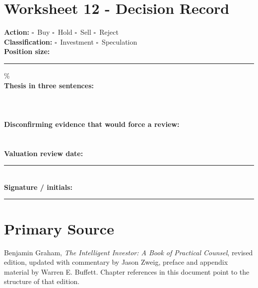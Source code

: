 \documentclass[11pt]{article}
\newcommand{\checkbox}{\(\square\)}
\newcommand{\blankline}{\makebox[\linewidth][l]{\rule{0.96\linewidth}{0.35pt}}}
\begin{document}
\section{Worksheet 12 - Decision Record}
\begin{worksheetbox}
\textbf{Action:} \checkbox\ Buy \quad \checkbox\ Hold \quad \checkbox\ Sell \quad \checkbox\ Reject\\[8pt]
\textbf{Classification:} \checkbox\ Investment \quad \checkbox\ Speculation\\[8pt]
\textbf{Position size:} \rule{1.3in}{0.35pt}\%\\[8pt]
\textbf{Thesis in three sentences:}\\[4pt]\blankline\\[10pt]\blankline\\[10pt]\blankline\\[10pt]
\textbf{Disconfirming evidence that would force a review:}\\[4pt]\blankline\\[10pt]\blankline\\[10pt]
\textbf{Valuation review date:} \rule{1.8in}{0.35pt}\\[8pt]
\textbf{Signature / initials:} \rule{1.8in}{0.35pt}
\end{worksheetbox}

\section*{Primary Source}
Benjamin Graham, \textit{The Intelligent Investor: A Book of Practical Counsel}, revised edition, updated with commentary by Jason Zweig, preface and appendix material by Warren E. Buffett. Chapter references in this document point to the structure of that edition.
\end{document}

